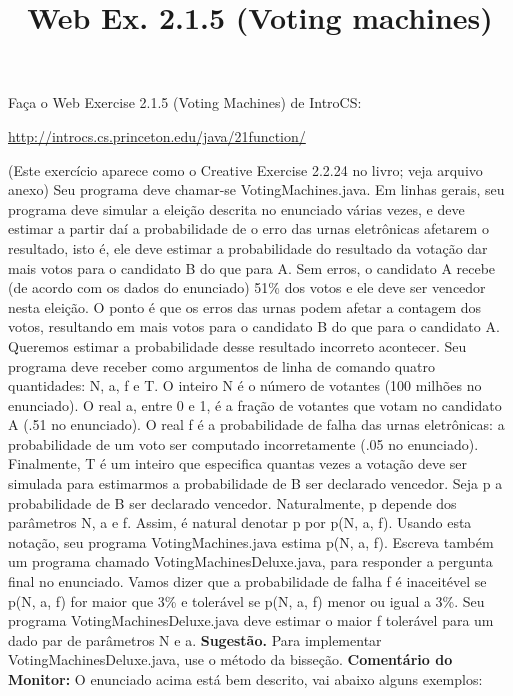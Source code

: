 \documentclass{article}
\title{Web Ex. 2.1.5 (Voting machines)}
\date{}
\author{}
\begin{document}
\maketitle

Fa\c{c}a o Web Exercise 2.1.5 (Voting Machines) de IntroCS:

\url{http://introcs.cs.princeton.edu/java/21function/}

(Este exerc\'icio aparece como o Creative Exercise 2.2.24 no livro; veja arquivo anexo)
\bigbreak
Seu programa deve chamar-se VotingMachines.java. Em linhas gerais, seu programa deve simular a elei\c{c}\~ao descrita no enunciado v\'arias vezes, e deve estimar a partir da\'i a probabilidade de o erro das urnas eletr\^onicas afetarem o resultado, isto \'e, ele deve estimar a probabilidade do resultado da vota\c{c}\~ao dar mais votos para o candidato B do que para A. Sem erros, o candidato A recebe (de acordo com os dados do enunciado) 51\% dos votos e ele deve ser vencedor nesta elei\c{c}\~ao. O ponto \'e que os erros das urnas podem afetar a contagem dos votos, resultando em mais votos para o candidato B do que para o candidato A. Queremos estimar a probabilidade desse resultado incorreto acontecer.
\bigbreak
Seu programa deve receber como argumentos de linha de comando quatro quantidades: N, a, f e T. O inteiro N \'e o n\'umero de votantes (100 milh\~oes no enunciado). O real a, entre 0 e 1, \'e a fra\c{c}\~ao de votantes que votam no candidato A (.51 no enunciado). O real f \'e a probabilidade de falha das urnas eletr\^onicas: a probabilidade de um voto ser computado incorretamente (.05 no enunciado). Finalmente, T \'e um inteiro que especifica quantas vezes a vota\c{c}\~ao deve ser simulada para estimarmos a probabilidade de B ser declarado vencedor.
\bigbreak
Seja p a probabilidade de B ser declarado vencedor. Naturalmente, p depende dos par\^ametros N, a e f. Assim, \'e natural denotar p por p(N, a, f). Usando esta nota\c{c}\~ao, seu programa VotingMachines.java estima p(N, a, f).
\bigbreak
Escreva tamb\'em um programa chamado VotingMachinesDeluxe.java, para responder a pergunta final no enunciado. Vamos dizer que a probabilidade de falha f \'e inaceit\'evel se p(N, a, f) for maior que 3\% e toler\'avel se p(N, a, f) menor ou igual a 3\%. Seu programa VotingMachinesDeluxe.java deve estimar o maior f toler\'avel para um dado par de par\^ametros N e a.
\bigbreak
\textbf{Sugest\~ao.} Para implementar VotingMachinesDeluxe.java, use o m\'etodo da bisse\c{c}\~ao.
\bigbreak
\hrulefill
\bigbreak
\textbf{Coment\'ario do Monitor:}
\bigbreak
O enunciado acima est\'a bem descrito, vai abaixo alguns exemplos:
\end{document}
